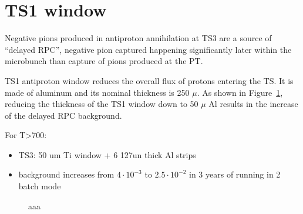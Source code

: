 %
\section{TS1 window}

Negative pions produced in antiproton annihilation at TS3 are a source
of ``delayed RPC'', negative pion captured happening significantly later
within the microbunch than capture of pions produced at the PT. 

TS1 antiproton window reduces the overall flux of protons entering the TS.
It is made of aluminum and its nominal thickness is 250 $\mu$.
As shown in Figure~\ref{figure:760_1300_vs_760_1000_ts4},
reducing the thickness of the TS1 window down to 50 $\mu$ Al results in the
increase of the delayed RPC background.

For T>700:

\begin{itemize}
\item
  TS3: 50 um Ti window + 6 127un thick Al strips 
\item
  background increases from $4 \cdot 10^{-3}$ to $2.5 \cdot 10^{-2}$
  in 3 years of running in 2 batch mode \cite{MU2E_33410_MURAT}
\end{itemize}

\begin{figure}
  \caption{
    \label{figure:760_1300_vs_760_1000_ts4}
    aaa
  }
\end{figure}
